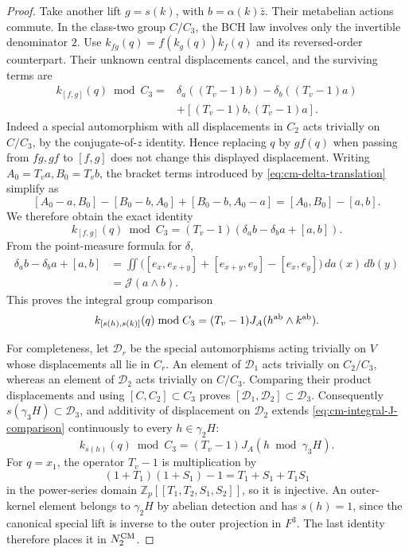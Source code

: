 \begin{proof}
Take another lift \(g=s(k)\), with
\(b=\alpha(k)\bar z\).  Their metabelian actions
commute.  In the class-two group \(C/C_3\), the BCH
law involves only the invertible denominator \(2\).
Use
\(k_{fg}(q)=f(k_g(q))k_f(q)\) and its reversed-order
counterpart.  Their unknown central displacements
cancel, and the surviving terms are
\begin{align*}
 k_{[f,g]}(q)\bmod C_3
  ={}&\delta_a((T_v-1)b)-\delta_b((T_v-1)a)\\
     &+[(T_v-1)b,(T_v-1)a].
\end{align*}
Indeed a special automorphism with all displacements
in \(C_2\) acts trivially on \(C/C_3\), by the
conjugate-of-\(z\) identity.  Hence replacing \(q\)
by \(gf(q)\) when passing from \(fg,gf\) to
\([f,g]\) does not change this displayed displacement.
Writing \(A_0=T_va,B_0=T_vb\), the bracket terms
introduced by \eqref{eq:cm-delta-translation} simplify as
\[
 [A_0-a,B_0]-[B_0-b,A_0]+[B_0-b,A_0-a]
                         =[A_0,B_0]-[a,b].
\]
We therefore obtain the exact identity
\[
 k_{[f,g]}(q)\bmod C_3
       =(T_v-1)(\delta_ab-\delta_ba+[a,b]).
\]
From the point-measure formula for \(\delta\),
\begin{align*}
 \delta_ab-\delta_ba+[a,b]
 &=\iint\bigl([e_x,e_{x+y}]+[e_{x+y},e_y]
                         -[e_x,e_y]\bigr)\,da(x)\,db(y)\\
 &=\mathcal J(a\wedge b).
\end{align*}
This proves the integral group comparison
\begin{equation}\label{eq:cm-integral-J-comparison}
 k_{[s(h),s(k)]}(q)\bmod C_3
      =(T_v-1)J_A(h^{\rm ab}\wedge k^{\rm ab}).
\end{equation}

For completeness, let \(\mathcal D_r\) be the special
automorphisms acting trivially on \(V\) whose
displacements all lie in \(C_r\).
An element of \(\mathcal D_1\) acts trivially on
\(C_2/C_3\), whereas an element of \(\mathcal D_2\)
acts trivially on \(C/C_3\).  Comparing their product
displacements and using \([C,C_2]\subset C_3\) proves
\([\mathcal D_1,\mathcal D_2]\subset\mathcal D_3\).
Consequently \(s(\gamma_3H)\subset\mathcal D_3\),
and additivity of displacement on \(\mathcal D_2\)
extends \eqref{eq:cm-integral-J-comparison} continuously
to every \(h\in\gamma_2H\):
\[
 k_{s(h)}(q)\bmod C_3=(T_v-1)J_A(h\bmod\gamma_3H).
\]
For \(q=x_1\), the operator \(T_v-1\) is multiplication
by
\[
 (1+T_1)(1+S_1)-1=T_1+S_1+T_1S_1
\]
in the power-series domain
\(\mathbb Z_p[[T_1,T_2,S_1,S_2]]\), so it is injective.
An outer-kernel element belongs to \(\gamma_2H\) by
abelian detection and has \(s(h)=1\), since the
canonical special lift is inverse to the outer
projection in \(F^3\).  The last identity therefore
places it in \(N_2^{\rm CM}\).


\end{proof}
